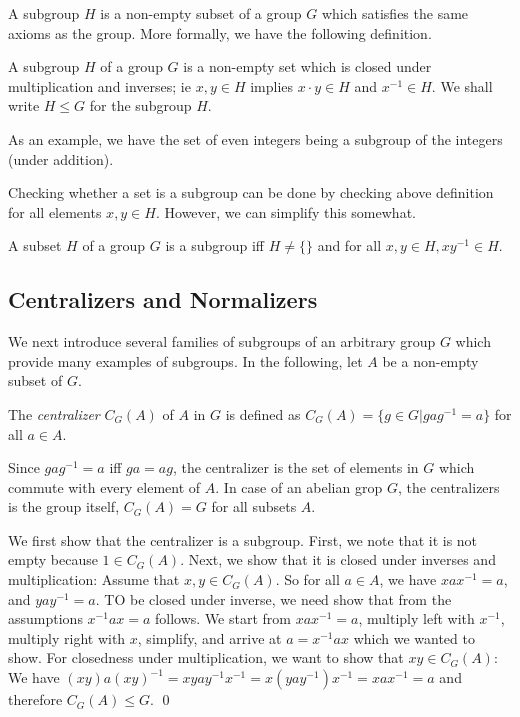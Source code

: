 
A subgroup $H$ is a non-empty subset of a group $G$ which satisfies the same axioms as the group. More formally, we have the following definition.

\begin{definition}
A subgroup $H$ of a group $G$ is a non-empty set which is closed under multiplication and inverses; ie $x, y \in H$ implies $x \cdot y \in H$ and $x^{-1} \in H$. We shall write $H \leq G$ for the subgroup $H$.
\end{definition}

As an example, we have the set of even integers being a subgroup of the integers (under addition).

Checking whether a set is a subgroup can be done by checking above definition for all elements $x, y \in H$. However, we can simplify this somewhat.

\begin{theorem}
A subset $H$ of a group $G$ is a subgroup iff $H \neq \{\}$ and for all $x, y \in H, xy^{-1} \in H$.
\end{theorem}

\subsection{Centralizers and Normalizers}

We next introduce several families of subgroups of an arbitrary group $G$ which provide many examples of subgroups. In the following, let $A$ be a non-empty subset of $G$.

\begin{definition}
The \emph{centralizer} $C_G(A)$ of $A$ in $G$ is defined as $C_G(A) =\{g \in G | gag^{-1} = a\}$ for all $a \in A$. 
\end{definition}

Since $gag^{-1} = a$ iff $ga = ag$, the centralizer is the set of elements in $G$ which commute with every element of $A$. In case of an abelian grop $G$, the centralizers is the group itself, $C_G(A) = G$ for all subsets $A$.

We first show that the centralizer is a subgroup. First, we note that it is not empty because $1 \in C_G(A)$. Next, we show that it is closed under inverses and multiplication: Assume that $x, y \in C_G(A)$. So for all $a \in A$, we have $xax^{-1} = a$, and $yay^{-1} = a$. TO be closed under inverse, we need show that from the assumptions $x^{-1}ax = a$ follows. We start from $xax^{-1} = a$, multiply left with $x^{-1}$, multiply right with $x$, simplify, and arrive at $a = x^{-1}ax$ which we wanted to show. For closedness under multiplication, we want to show that $xy \in C_G(A)$: We have $(xy)a(xy)^{-1} = xya y^{-1} x^{-1} = x(ya y^{-1})x^{-1} = x a x^{-1} = a$ and therefore $C_G(A) \leq G$. \qed


